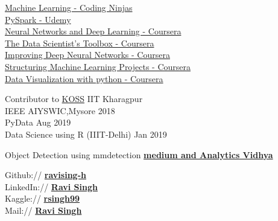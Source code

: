 

\href{https://ninjasfiles.s3.amazonaws.com/certificate724139c57cef42fc1041714c6ed05db012daa.pdf}{Machine Learning - Coding Ninjas} \\
\href{https://www.udemy.com/}{PySpark - Udemy}\\
\href{https://www.coursera.org/user/4bc2fa344157582220273235674a6760}{Neural  Networks  and Deep Learning - Coursera}\\
\href{https://www.coursera.org/user/4bc2fa344157582220273235674a6760}{The Data Scientist's Toolbox - Coursera}\\
\href{https://www.coursera.org/user/4bc2fa344157582220273235674a6760}{Improving Deep Neural Networks - Coursera}\\
\href{https://www.coursera.org/user/4bc2fa344157582220273235674a6760}{Structuring Machine Learning Projects - Coursera}\\
\href{https://www.coursera.org/user/4bc2fa344157582220273235674a6760}{Data Visualization with python -  Coursera}
\vspace{15}
\newline
{}

Contributor to \href{https://kossiitkgp.org/}{KOSS} IIT Kharagpur \\
IEEE AIYSWIC,Mysore 2018 \\
PyData Aug 2019\\
Data Science using R (IIIT-Delhi) Jan 2019

\vspace{15}
\newline
{}

Object Detection using mmdetection  \href{https://medium.com/@ravisingh93362/object-detection-using-mmdetection-c7f0eb26a2c9#e492-62d267d9bc08}{\bf medium and Analytics Vidhya}

\newline
\vspace{15}

Github:// \href{https://github.com/ravising-h}{\bf ravising-h} \\
LinkedIn://  \href{https://www.linkedin.com/in/ravi-singh-5a6576162/}{\bf Ravi Singh} \\
Kaggle:// \href{https://www.kaggle.com/rsingh99}{\bf rsingh99} \\
Mail://  \href{mailbox.ravisingh@gmail.com}{\bf Ravi Singh}
